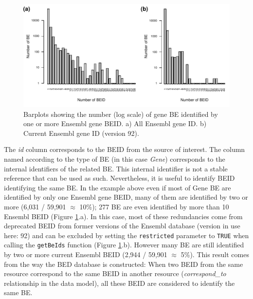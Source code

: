 \documentclass[9pt,a4paper,]{extarticle}
\theoremstyle{definition}
\theoremstyle{definition}
\theoremstyle{definition}
\theoremstyle{remark}
\begin{document}
\begin{figure}

{\centering \includegraphics[width=1\linewidth]{BED-F1000-Article_files/figure-latex/beidTables-1} 

}

\caption{Barplots showing the number (log scale) of gene BE identified by one or more Ensembl gene BEID. a) All Ensembl gene ID. b) Current Ensembl gene ID (version 92).}\label{fig:beidTables}
\end{figure}

The \emph{id} column corresponds to the BEID from the source of interest.
The column named according to the type of BE (in this case \emph{Gene})
corresponds to the internal identifiers of the related BE.
This internal identifier is not a stable reference that can be used as such.
Nevertheless, it is useful to identify BEID identifying the
same BE.
In the example above even if most of Gene BE are identified by only
one Ensembl gene BEID, many of them are identified by two or more
(6,031
/ 59,901
\(\approx\) 10\%);
277 BE
are even identified by more than 10 Ensembl BEID
(Figure \ref{fig:beidTables}.a).
In this case, most of these redundancies come from deprecated BEID from former
versions of the Ensembl database (version in use here: 92)
and can be excluded by setting the \texttt{restricted} parameter to \texttt{TRUE} when calling
the \texttt{getBeIds} function (Figure \ref{fig:beidTables}.b).
However many BE are still identified by two or more current Ensembl BEID
(2,944
/ 59,901
\(\approx\) 5\%).
This result comes from the way the BED database is constructed:
When two BEID from the same resource correspond to the same BEID
in another resource (\emph{correspond\_to} relationship in the data model),
all these BEID are considered to identify the same BE.
\end{document}
